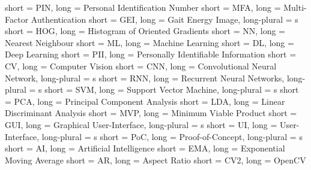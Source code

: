  {
    short = PIN,
    long = Personal Identification Number
}
 {
    short = MFA,
    long = Multi-Factor Authentication
}
 {
    short = GEI,
    long = Gait Energy Image,
    long-plural = s
}
 {
    short = HOG,
    long = Histogram of Oriented Gradients
}
 {
    short = NN,
    long = Nearest Neighbour
}
 {
    short = ML,
    long = Machine Learning
}
 {
    short = DL,
    long = Deep Learning
}
 {
    short = PII,
    long = Personally Identifiable Information
}
 {
    short = CV,
    long = Computer Vision
}
 {
    short = CNN,
    long = Convolutional Neural Network,
    long-plural = s
}
 {
    short = RNN,
    long = Recurrent Neural Networks,
    long-plural = s
}
 {
    short = SVM,
    long = Support Vector Machine,
    long-plural = s
}
 {
    short = PCA,
    long = Principal Component Analysis
}
 {
    short = LDA,
    long = Linear Discriminant Analysis
}
 {
    short = MVP,
    long = Minimum Viable Product
}
 {
    short = GUI,
    long = Graphical User-Interface,
    long-plural = s
}
 {
    short = UI,
    long = User-Interface,
    long-plural = s
}
 {
    short = PoC,
    long = Proof-of-Concept,
    long-plural = s
}
 {
    short = AI,
    long = Artificial Intelligence
}
 {
    short = EMA,
    long = Exponential Moving Average
}
 {
    short = AR,
    long = Aspect Ratio
}
 {
    short = CV2,
    long = OpenCV
}
